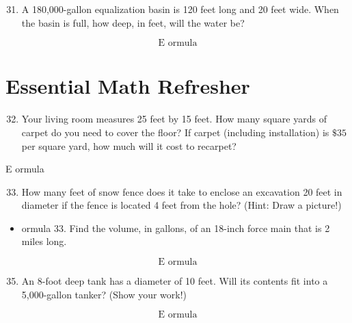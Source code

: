 \documentclass[10pt]{article}
\begin{document}
\begin{enumerate}
  \setcounter{enumi}{30}
  \item A 180,000-gallon equalization basin is 120 feet long and 20 feet wide. When the basin is full, how deep, in feet, will the water be?
\end{enumerate}
$$
\text { E ormula }
$$

\section{Essential Math Refresher}
\begin{enumerate}
  \setcounter{enumi}{31}
  \item Your living room measures 25 feet by 15 feet. How many square yards of carpet do you need to cover the floor? If carpet (including installation) is $\$ 35$ per square yard, how much will it cost to recarpet?
\end{enumerate}
E ormula

\begin{enumerate}
  \setcounter{enumi}{32}
  \item How many feet of snow fence does it take to enclose an excavation 20 feet in diameter if the fence is located 4 feet from the hole? (Hint: Draw a picture!)
\end{enumerate}
\begin{itemize}
  \item ormula 33. Find the volume, in gallons, of an 18-inch force main that is 2 miles long.
\end{itemize}
$$
\text { E ormula }
$$

\begin{enumerate}
  \setcounter{enumi}{34}
  \item An 8-foot deep tank has a diameter of 10 feet. Will its contents fit into a 5,000-gallon tanker? (Show your work!)
\end{enumerate}
$$
\text { E ormula }
$$
\end{document}
